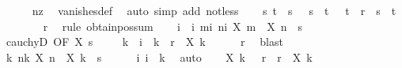 \begin{isabellebody}
\ \ \ \ \isamarkupfalse%
\ nz\ \isamarkupfalse%
\ vanishes{\isacharunderscore}{\kern0pt}def\ \isamarkupfalse%
\ {\isacharparenleft}{\kern0pt}auto\ simp\ add{\isacharcolon}{\kern0pt}\ not{\isacharunderscore}{\kern0pt}less{\isacharparenright}{\kern0pt}\isanewline
\ \ \isamarkupfalse%
\ s\ t\ \ s{\isacharcolon}{\kern0pt}\ {\isachardoublequoteopen}{}\ {\isacharless}{\kern0pt}\ s{\isachardoublequoteclose}\ \ t{\isacharcolon}{\kern0pt}\ {\isachardoublequoteopen}{}\ {\isacharless}{\kern0pt}\ t{\isachardoublequoteclose}\ \ {\isachardoublequoteopen}r\ {\isacharequal}{\kern0pt}\ s\ {\isacharplus}{\kern0pt}\ t{\isachardoublequoteclose}\isanewline
\ \ \ \ \isamarkupfalse%
\ {\isacartoucheopen}{}\ {\isacharless}{\kern0pt}\ r{\isacartoucheclose}\ \isamarkupfalse%
\ {\isacharparenleft}{\kern0pt}rule\ obtain{\isacharunderscore}{\kern0pt}pos{\isacharunderscore}{\kern0pt}sum{\isacharparenright}{\kern0pt}\isanewline
\ \ \isamarkupfalse%
\ i\ \ i{\isacharcolon}{\kern0pt}\ {\isachardoublequoteopen}{\isasymforall}m{\isasymge}i{\isachardot}{\kern0pt}\ {\isasymforall}n{\isasymge}i{\isachardot}{\kern0pt}\ {\isasymbar}X\ m\ {\isacharminus}{\kern0pt}\ X\ n{\isasymbar}\ {\isacharless}{\kern0pt}\ s{\isachardoublequoteclose}\isanewline
\ \ \ \ \isamarkupfalse%
\ cauchyD\ {\isacharbrackleft}{\kern0pt}OF\ X\ s{\isacharbrackright}{\kern0pt}\ \isacommand{{\isachardot}{\kern0pt}{\isachardot}{\kern0pt}}\isamarkupfalse%
\isanewline
\ \ \isamarkupfalse%
\ k\ \ {\isachardoublequoteopen}i\ {\isasymle}\ k{\isachardoublequoteclose}\ \ {\isachardoublequoteopen}r\ {\isasymle}\ {\isasymbar}X\ k{\isasymbar}{\isachardoublequoteclose}\isanewline
\ \ \ \ \isamarkupfalse%
\ r\ \isamarkupfalse%
\ blast\isanewline
\ \ \isamarkupfalse%
\ k{\isacharcolon}{\kern0pt}\ {\isachardoublequoteopen}{\isasymforall}n{\isasymge}k{\isachardot}{\kern0pt}\ {\isasymbar}X\ n\ {\isacharminus}{\kern0pt}\ X\ k{\isasymbar}\ {\isacharless}{\kern0pt}\ s{\isachardoublequoteclose}\isanewline
\ \ \ \ \isamarkupfalse%
\ i\ {\isacartoucheopen}i\ {\isasymle}\ k{\isacartoucheclose}\ \isamarkupfalse%
\ auto\isanewline
\ \ \isamarkupfalse%
\ {\isachardoublequoteopen}X\ k\ {\isasymle}\ {\isacharminus}{\kern0pt}\ r\ {\isasymor}\ r\ {\isasymle}\ X\ k{\isachardoublequoteclose}\isanewline

\end{isabellebody}
